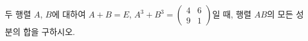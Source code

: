 \hspace*{2mm}\begin{minipage}[t]{\dimexpr\linewidth-2mm\relax}\vspace{0pt}
두 행렬 $A$, $B$에 대하여 $A+B=E$, $A^3+B^3=\begin{pmatrix} 4 & 6 \\ 9 & 1 \end{pmatrix}$일 때, 행렬 $AB$의 모든 성분의 합을 구하시오. \end{minipage}
